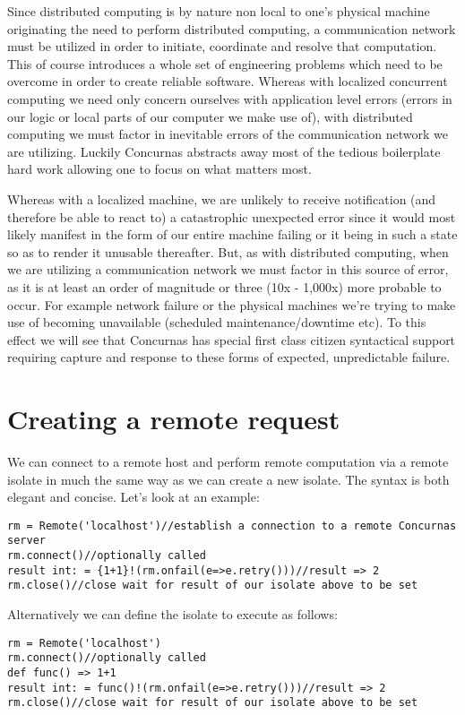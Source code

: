 \documentclass[conc-doc]{subfiles}
\begin{document}
Since distributed computing is by nature non local to one's physical machine originating the need to perform distributed computing, a communication network must be utilized in order to initiate, coordinate and resolve that computation. This of course introduces a whole set of engineering problems which need to be overcome in order to create reliable software. Whereas with localized concurrent computing we need only concern ourselves with application level errors (errors in our logic or local parts of our computer we make use of), with distributed computing we must factor in inevitable errors of the communication network we are utilizing. Luckily Concurnas abstracts away most of the tedious boilerplate hard work allowing one to focus on what matters most.

Whereas with a localized machine, we are unlikely to receive notification (and therefore be able to react to) a catastrophic unexpected error since it would most likely manifest in the form of our entire machine failing or it being in such a state so as to render it unusable thereafter. But, as with distributed computing, when we are utilizing a communication network we must factor in this source of error, as it is at least an order of magnitude or three (10x - 1,000x) more probable to occur. For example network failure or the physical machines we're trying to make use of becoming unavailable (scheduled maintenance/downtime etc). To this effect we will see that Concurnas has special first class citizen syntactical support requiring capture and response to these forms of expected, unpredictable failure.

\section{Creating a remote request}	
We can connect to a remote host and perform remote computation via a remote isolate in much the same way as we can create a new isolate. The syntax is both elegant and concise. Let's look at an example:
\begin{lstlisting}
rm = Remote('localhost')//establish a connection to a remote Concurnas server
rm.connect()//optionally called
result int: = {1+1}!(rm.onfail(e=>e.retry()))//result => 2
rm.close()//close wait for result of our isolate above to be set
\end{lstlisting}

Alternatively we can define the isolate to execute as follows:

\begin{lstlisting}
rm = Remote('localhost')
rm.connect()//optionally called
def func() => 1+1
result int: = func()!(rm.onfail(e=>e.retry()))//result => 2
rm.close()//close wait for result of our isolate above to be set
\end{lstlisting}
\end{document}
